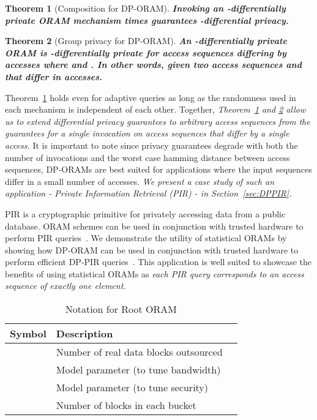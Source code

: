 \documentclass[USenglish,oneside,twocolumn]{article}
\makeatletter
\newtheorem{theorem}{Theorem}
\newcommand{\ourprotocol}{Root ORAM}
\let\origsection\section
\renewcommand\section{\@ifstar{\starsection}{\nostarsection}}
\newcommand\nostarsection[1]
{\sectionprelude\origsection{#1}\sectionpostlude}
\newcommand\starsection[1]
{\sectionprelude\origsection*{#1}\sectionpostlude}
\newcommand\sectionprelude{\vspace{-1em}
}
\newcommand\sectionpostlude{\vspace{-1em}
}
\makeatother
\begin{document}
\begin{theorem}[Composition for DP-ORAM]\label{thm:composability}
\textbf{Invoking an -differentially private ORAM mechanism  times guarantees -differential privacy.}
\end{theorem}



\begin{theorem}[Group privacy for DP-ORAM]\label{thm:groupprivacy}
\textbf{An -differentially private ORAM is -differentially private for access sequences differing by  accesses where  and . In other words, given two access sequences  and  that differ in  accesses.
}
\end{theorem}


Theorem~\ref{thm:composability} holds even for adaptive queries as long as the randomness used in each mechanism is independent of each other. Together, \textit{Theorem~\ref{thm:composability} and \ref{thm:groupprivacy} allow us to extend differential privacy guarantees to arbitrary access sequences from the guarantees for a single invocation on access sequences that differ by a single access.} It is important to note since privacy guarantees degrade with both the number of invocations and the worst case hamming distance between access sequences, DP-ORAMs are best suited for applications where the input sequences differ 
in a small number of accesses. \textit{We present a case study of such an application - Private Information Retrieval (PIR) - in 
Section~\ref{sec:DPPIR}.}

PIR is a cryptographic primitive for privately accessing data from a public database. 
ORAM schemes can be used in conjunction with trusted hardware to perform 
PIR queries~\cite{williams2008usable, backes2012obliviad}.
We demonstrate the utility of statistical ORAMs by showing how DP-ORAM can be used in 
conjunction with trusted hardware to perform efficient DP-PIR queries~\cite{goldbergDPPIR}. 
This application is well suited to showcase the benefits of using statistical ORAMs as 
\textit{each PIR query corresponds to an access sequence of exactly one element.}



 \section{\ourprotocol{} overview}\label{sec:overview}

\begin{table}[t]
\centering
\resizebox{\columnwidth}{!}
{\begin{tabular}{cll|} \toprule
Symbol  & Description \\
\midrule
      	 	& Number of real data blocks outsourced\\
    & Model parameter (to tune bandwidth)\\
				& Model parameter (to tune security) \\
      		    				& Number of blocks in each bucket\\
\bottomrule 
\end{tabular}}
\caption{Notation for \ourprotocol{}}
\label{table:notationrootoram}
\end{table}
\end{document}
